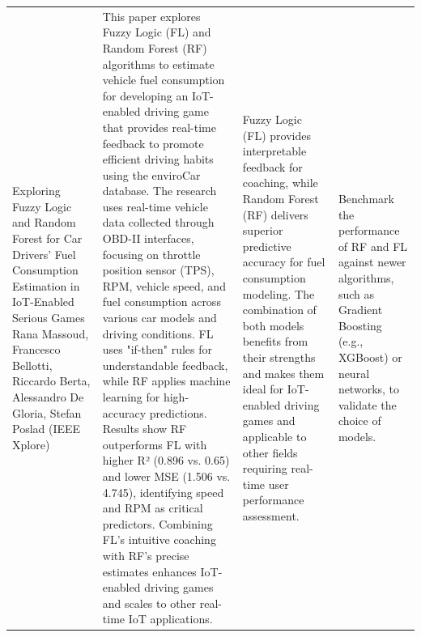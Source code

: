 \begin{longtable}{|p{}|p{}|p{}|p{}|}
Exploring Fuzzy Logic and Random Forest for Car Drivers’ Fuel Consumption Estimation in IoT-Enabled Serious Games
\newline
Rana Massoud, Francesco Bellotti, Riccardo Berta, Alessandro De Gloria, Stefan Poslad
\newline
(IEEE Xplore) &
This paper explores Fuzzy Logic (FL) and Random Forest (RF) algorithms to estimate vehicle fuel consumption for developing an IoT-enabled driving game that provides real-time feedback to promote efficient driving habits using the enviroCar database.
\newline
The research uses real-time vehicle data collected through OBD-II interfaces, focusing on throttle position sensor (TPS), RPM, vehicle speed, and fuel consumption across various car models and driving conditions. FL uses "if-then" rules for understandable feedback, while RF applies machine learning for high-accuracy predictions.
\newline
Results show RF outperforms FL with higher R² (0.896 vs. 0.65) and lower MSE (1.506 vs. 4.745), identifying speed and RPM as critical predictors. Combining FL's intuitive coaching with RF's precise estimates enhances IoT-enabled driving games and scales to other real-time IoT applications.
&
Fuzzy Logic (FL) provides interpretable feedback for coaching, while Random Forest (RF) delivers superior predictive accuracy for fuel consumption modeling. The combination of both models benefits from their strengths and makes them ideal for IoT-enabled driving games and applicable to other fields requiring real-time user performance assessment. 
&
Benchmark the performance of RF and FL against newer algorithms, such as Gradient Boosting (e.g., XGBoost) or neural networks, to validate the choice of models. \\


\end{longtable}

\newpage
\vspace*{1cm} %

